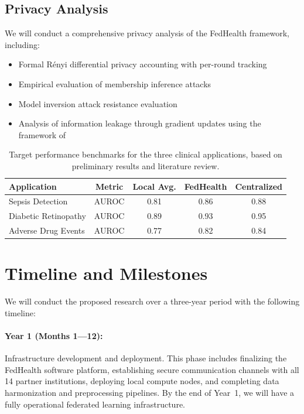 \documentclass[12pt,letterpaper]{article}
\begin{document}
\subsection{Privacy Analysis}

We will conduct a comprehensive privacy analysis of the FedHealth framework, including:
\begin{itemize}
  \item Formal R\'{e}nyi differential privacy accounting with per-round tracking
  \item Empirical evaluation of membership inference attacks \citep{Shokri2017, Carlini2022}
  \item Model inversion attack resistance evaluation
  \item Analysis of information leakage through gradient updates using the framework of \citet{Balle2022}
\end{itemize}

\begin{table}[H]
\centering
\caption{Target performance benchmarks for the three clinical applications, based on preliminary results and literature review.}
\label{tab:targets}
\begin{tabular}{lcccc}
\toprule
\textbf{Application} & \textbf{Metric} & \textbf{Local Avg.} & \textbf{FedHealth} & \textbf{Centralized} \\
\midrule
Sepsis Detection & AUROC & 0.81 & 0.86 & 0.88 \\
Diabetic Retinopathy & AUROC & 0.89 & 0.93 & 0.95 \\
Adverse Drug Events & AUROC & 0.77 & 0.82 & 0.84 \\
\bottomrule
\end{tabular}
\end{table}

\section{Timeline and Milestones}
\label{sec:timeline}

We will conduct the proposed research over a three-year period with the following timeline:

\paragraph{Year 1 (Months 1---12):} Infrastructure development and deployment. This phase includes finalizing the FedHealth software platform, establishing secure communication channels with all 14 partner institutions, deploying local compute nodes, and completing data harmonization and preprocessing pipelines. By the end of Year~1, we will have a fully operational federated learning infrastructure.
\end{document}
